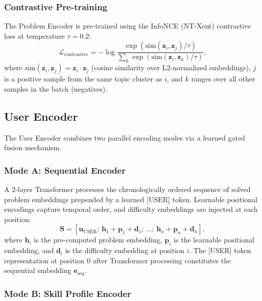 \documentclass[12pt]{article}
\begin{document}
\subsubsection{Contrastive Pre-training}

The Problem Encoder is pre-trained using the InfoNCE (NT-Xent) contrastive loss at temperature $\tau = 0.2$:
\begin{equation}
\mathcal{L}_{\text{contrastive}} = -\log\frac{\exp(\text{sim}(\mathbf{z}_i, \mathbf{z}_j) / \tau)}{\sum_{k} \exp(\text{sim}(\mathbf{z}_i, \mathbf{z}_k) / \tau)},
\end{equation}
where $\text{sim}(\mathbf{z}_i, \mathbf{z}_j) = \mathbf{z}_i \cdot \mathbf{z}_j$ (cosine similarity over L2-normalized embeddings), $j$ is a positive sample from the same topic cluster as $i$, and $k$ ranges over all other samples in the batch (negatives).

\subsection{User Encoder}

The User Encoder combines two parallel encoding modes via a learned gated fusion mechanism.

\subsubsection{Mode A: Sequential Encoder}

A 2-layer Transformer processes the chronologically ordered sequence of solved problem embeddings prepended by a learned [USER] token. Learnable positional encodings capture temporal order, and difficulty embeddings are injected at each position:
\begin{equation}
\mathbf{S} = [\mathbf{u}_{\text{USER}};\, \mathbf{h}_1 + \mathbf{p}_1 + \mathbf{d}_1;\, \ldots;\, \mathbf{h}_n + \mathbf{p}_n + \mathbf{d}_n],
\end{equation}
where $\mathbf{h}_i$ is the pre-computed problem embedding, $\mathbf{p}_i$ is the learnable positional embedding, and $\mathbf{d}_i$ is the difficulty embedding at position $i$. The [USER] token representation at position 0 after Transformer processing constitutes the sequential embedding $\mathbf{e}_{\text{seq}}$.

\subsubsection{Mode B: Skill Profile Encoder}
\end{document}
